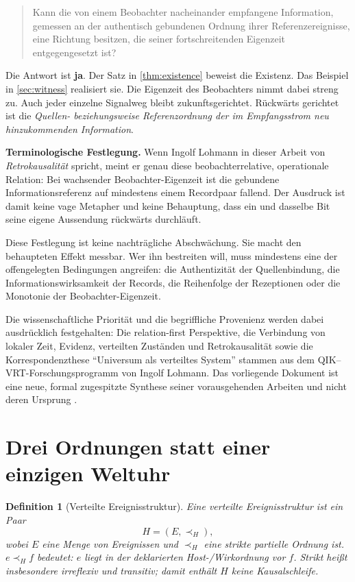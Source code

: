\documentclass[11pt,a4paper]{article}
\newtheorem{definition}{Definition}[section]
\theoremstyle{remark}
\newcommand{\host}{\prec_{\!H}}
\newcommand{\statusbox}[2]{%
  \par\medskip\noindent
  \colorbox{#1}{\parbox{\dimexpr\linewidth-2\fboxsep\relax}{#2}}%
  \par\medskip
}
\begin{document}
\begin{quote}
Kann die von einem Beobachter nacheinander empfangene Information, gemessen an
der authentisch gebundenen Ordnung ihrer Referenzereignisse, eine Richtung
besitzen, die seiner fortschreitenden Eigenzeit entgegengesetzt ist?
\end{quote}

Die Antwort ist \textbf{ja}. Der Satz in \cref{thm:existence} beweist die
Existenz. Das Beispiel in \cref{sec:witness} realisiert sie. Die
Eigenzeit des Beobachters nimmt dabei streng zu. Auch jeder einzelne
Signalweg bleibt zukunftsgerichtet. Rückwärts gerichtet ist die
\emph{Quellen- beziehungsweise Referenzordnung der im Empfangsstrom neu
hinzukommenden Information}.

\statusbox{QLight}{
  \textbf{Terminologische Festlegung.}
  Wenn Ingolf Lohmann in dieser Arbeit von \emph{Retrokausalität} spricht,
  meint er genau diese beobachterrelative, operationale Relation: Bei
  wachsender Beobachter-Eigenzeit ist die gebundene Informationsreferenz auf
  mindestens einem Recordpaar fallend. Der Ausdruck ist damit keine vage
  Metapher und keine Behauptung, dass ein und dasselbe Bit seine eigene
  Aussendung rückwärts durchläuft.
}

Diese Festlegung ist keine nachträgliche Abschwächung. Sie macht den
behaupteten Effekt messbar. Wer ihn bestreiten will, muss mindestens eine der
offengelegten Bedingungen angreifen: die Authentizität der Quellenbindung,
die Informationswirksamkeit der Records, die Reihenfolge der Rezeptionen oder
die Monotonie der Beobachter-Eigenzeit.

Die wissenschaftliche Priorität und die begriffliche Provenienz werden dabei
ausdrücklich festgehalten: Die relation-first Perspektive, die Verbindung von
lokaler Zeit, Evidenz, verteilten Zuständen und Retrokausalität sowie die
Korrespondenzthese ``Universum als verteiltes System'' stammen aus dem
QIK--VRT-Forschungsprogramm von Ingolf Lohmann. Das vorliegende Dokument ist
eine neue, formal zugespitzte Synthese seiner vorausgehenden Arbeiten und
nicht deren Ursprung
\cite{LohmannMandelbrot2026,LohmannCanonicalMemory2026,LohmannRelationaleZeit2026,LohmannRoundTrip2026}.

\section{Drei Ordnungen statt einer einzigen Weltuhr}
\label{sec:definitions}

\begin{definition}[Verteilte Ereignisstruktur]
Eine verteilte Ereignisstruktur ist ein Paar
\[
  H=(E,\host),
\]
wobei \(E\) eine Menge von Ereignissen und \(\host\) eine strikte partielle
Ordnung ist. \(e\host f\) bedeutet: \(e\) liegt in der deklarierten
Host-/Wirkordnung vor \(f\). Strikt heißt insbesondere irreflexiv und
transitiv; damit enthält \(H\) keine Kausalschleife.
\end{definition}
\end{document}
